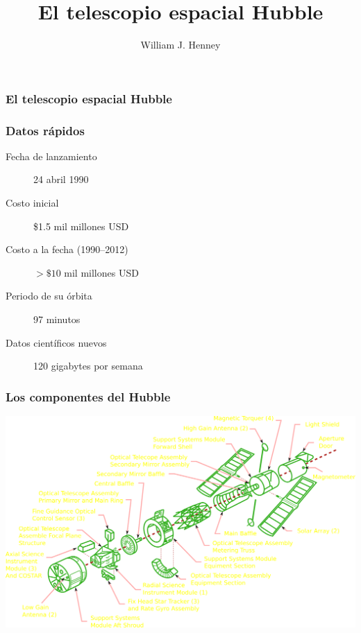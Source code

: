 \documentclass{beamer}
\title{El telescopio espacial Hubble}
\author
{
  William J. Henney
}                               %
\institute[CRyA, UNAM]
{
  Centro de Radioastronomía y Astrofísica\\
  UNAM, Morelia, México
}
\begin{document}
\begin{frame}
  \titlepage
\end{frame}

\begin{frame}
  \frametitle{El telescopio espacial Hubble}
\end{frame}

\begin{frame}
  \frametitle{Datos rápidos}
  \begin{description}
  \item[Fecha de lanzamiento] 24 abril 1990
  \item[Costo inicial] \$1.5 mil millones USD
  \item[Costo a la fecha (1990--2012)] \(> \$10\) mil millones USD
  \item[Periodo de su órbita] 97 minutos
  \item[Datos científicos nuevos] 120 gigabytes por semana
  \end{description}
\end{frame}

\begin{frame}
  \frametitle{Los componentes del Hubble}
  \includegraphics{HubbleExploded-lightBG}
\end{frame}
\end{document}
